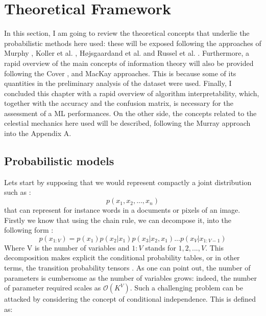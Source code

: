 \documentclass[12pt,%
               a4paper,%
               oneside,openany,%
               titlepage,%
               headinclude,footinclude,%
               BCOR5mm,%
               cleardoublepage=empty,%
               tablecaptionabove,%
               floatperchapter,
               ]{scrreprt}                 %
\begin{document}
 


\chapter{Theoretical Framework}

In this section, I am going to review the theoretical concepts
that underlie the probabilistic methods here used: these will be
exposed following the approaches of Murphy \cite{murphy2012machine} , Koller
et al. \citep{koller2009probabilistic}, Højsgaardand et al. \citep{hojsgaard2012graphical} and Russel et al. \citep{russell2010artificial}. Furthermore, a rapid overview of the main concepts of information theory will also be provided following the Cover \citep{cover2006elements}, and MacKay \citep{mackay2003information} approaches. This is because some of its quantities in the preliminary analysis of the dataset were used. Finally, I concluded this chapter with a rapid overview of algorithm interpretability, which, together with the accuracy and the
confusion matrix, is necessary for the assessment of a ML performances. On the other side, the concepts related to the celestial
mechanics here used will be described, following the Murray
approach \cite{murray1999solar} into the Appendix A.

\section{Probabilistic models}

Lets start by supposing that we would represent compactly a joint distribution such as \cite{murphy2012machine}:
\begin{equation}
p(x_{1},x_{2},...,x_{n})
\end{equation}
that can represent for instance words in a documents or pixels of an image.  Firstly we know that using the chain rule,  we can decompose it, into the following form \cite{murphy2012machine}:
\begin{equation}
p(x_{1:V})=p(x_{1})p(x_{2}|x_{1})p(x_{3}|x_{2},x_{1})...p(x_{V}|x_{1:V-1})
\end{equation}
Where V is the number of variables and $1:V$ stands for ${1,2,...,V}$.  This decomposition makes explicit the conditional probability tables, or in other terms, the transition probability tensors \cite{wu2017markov}.  As one can point out, the number of parameters is cumbersome as the number of variables grows: indeed, the number of parameter required scales as $\mathcal{O}(K^{V})$.  Such a challenging problem can be attacked by considering the concept of conditional independence. This is defined as\cite{murphy2012machine}:
\end{document}
